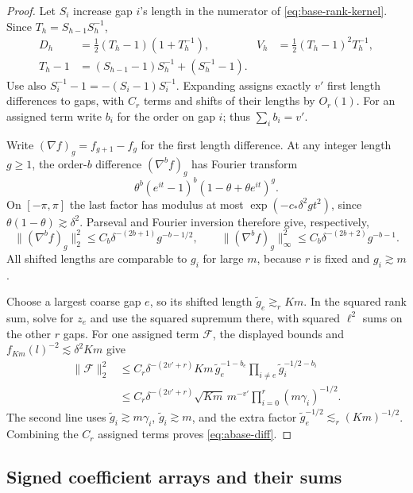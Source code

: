 \begin{proof}
Let \(S_i\) increase gap \(i\)'s length in the numerator of
\eqref{eq:base-rank-kernel}. Since \(T_h=S_{h-1}S_h^{-1}\),
\[
\begin{aligned}
 D_h&=\tfrac12(T_h-1)(1+T_h^{-1}),&
 V_h&=\tfrac12(T_h-1)^2T_h^{-1},\\
 T_h-1&=(S_{h-1}-1)S_h^{-1}+(S_h^{-1}-1).
\end{aligned}
\]
Use also \(S_i^{-1}-1=-(S_i-1)S_i^{-1}\). Expanding assigns exactly \(v'\) first length differences to gaps, with \(C_r\) terms and shifts of their lengths by \(O_r(1)\). For an assigned term write \(b_i\) for the order on gap \(i\); thus \(\sum_i b_i=v'\).

Write \((\nabla f)_g=f_{g+1}-f_g\) for the first length difference. At any integer length \(g\ge1\), the order-\(b\) difference \((\nabla^b f)_g\) has Fourier transform
\[
 \theta^b(e^{it}-1)^b(1-\theta+\theta e^{it})^g.
\]
On \([-\pi,\pi]\) the last factor has modulus at most
\(\exp(-c_*\delta^2g t^2)\), since \(\theta(1-\theta)\gtrsim\delta^2\).
Parseval and Fourier inversion therefore give, respectively,
\[
 \|(\nabla^b f)_g\|_2^2
 \le C_b\delta^{-(2b+1)}g^{-b-1/2},\qquad
 \|(\nabla^b f)_g\|_\infty^2
 \le C_b\delta^{-(2b+2)}g^{-b-1}.
\]
All shifted lengths are comparable to \(g_i\) for large \(m\), because \(r\) is fixed and \(g_i\gtrsim m\).

Choose a largest coarse gap \(e\), so its shifted length
\(\widetilde g_e\gtrsim_r Km\). In the squared rank sum, solve for \(z_e\) and use the squared supremum there, with squared \(\ell^2\) sums on the other \(r\) gaps. For one assigned term \(\mathcal F\), the displayed bounds and
\(f_{Km}(l)^{-2}\lesssim\delta^2Km\) give
\[
\begin{aligned}
 \|\mathcal F\|_2^2
 &\le C_r\delta^{-(2v'+r)}Km\,
       \widetilde g_e^{-1-b_e}
       \prod_{i\ne e}\widetilde g_i^{-1/2-b_i}\\
 &\le C_r\delta^{-(2v'+r)}
       \sqrt{Km}\,m^{-v'}
       \prod_{i=0}^r(m\gamma_i)^{-1/2}.
\end{aligned}
\]
The second line uses \(\widetilde g_i\gtrsim m\gamma_i\),
\(\widetilde g_i\gtrsim m\), and the extra factor
\(\widetilde g_e^{-1/2}\lesssim_r(Km)^{-1/2}\).
Combining the \(C_r\) assigned terms proves \eqref{eq:abase-diff}.
\end{proof}

\subsection{Signed coefficient arrays and their sums}


